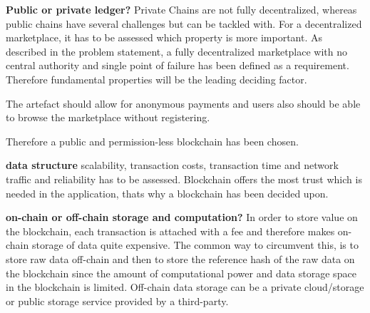 \textbf{Public or private ledger?}
Private Chains are not fully decentralized, whereas public chains have several challenges but can be tackled with. For a decentralized marketplace, it has to be assessed which property is more important. As described in the problem statement, a fully decentralized marketplace with no central authority and single point of failure has been defined as a requirement. Therefore fundamental properties will be the leading deciding factor.

The artefact should allow for anonymous payments and users also should be able to browse the marketplace without registering. 

Therefore a public and permission-less blockchain has been chosen. 

\textbf{data structure}
scalability, transaction costs, transaction time and network traffic and reliability has to be assessed. Blockchain offers the most trust which is needed in the application, thats why a blockchain has been decided upon. 

\textbf{on-chain or off-chain storage and computation?} 
In order to store value on the blockchain, each transaction is attached with a fee and therefore makes on-chain storage of data quite expensive.
The common way to circumvent this, is to store raw data off-chain and then to store the reference hash of the raw data on the blockchain since the amount of computational power and data storage space in the blockchain is limited. Off-chain data storage can be a private cloud/storage or public storage service provided by a third-party.  

 




